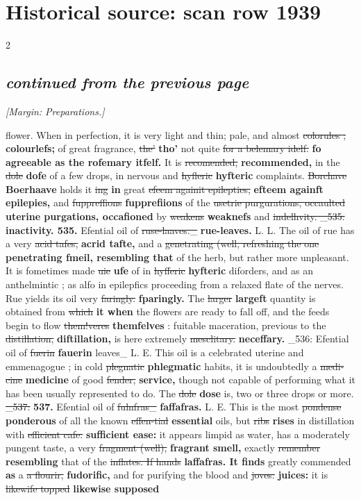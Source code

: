 \documentclass[10pt]{article}
\begin{document}
\section*{Historical source: scan row 1939}
\begin{multicols}{2}
\subsection*{\textit{continued from the previous page}}
{\small\itshape [Margin: Preparations.]}\par
flower. When in perfection, it is very light and thin; pale, and almost \sout{colorules ;} \textbf{colourlefs;} of great fragrance, \sout{the’} \textbf{tho'} not quite \sout{for a belemary idelf.} \textbf{fo agreeable as the rofemary itfelf.} It is \sout{recomended,} \textbf{recommended,} in the \sout{dole} \textbf{dofe} of a few drops, in nervous and \sout{hyfleric} \textbf{hyfteric} complaints. \sout{Borchave} \textbf{Boerhaave} holds it \sout{ing} \textbf{in} great \sout{efeem againit epilepties,} \textbf{efteem againft epilepies,} and \sout{fuppreffions} \textbf{fupprefiions} of the \sout{usetrie purgurations, occaulted} \textbf{uterine purgations, occafioned} by \sout{weakens} \textbf{weaknefs} and \sout{indelhvity. \_535:} \textbf{inactivity. 535.} Efential oil of \sout{ruse-laaves.\_} \textbf{rue-leaves.} L. L. The oil of rue has a very \sout{acid tafes,} \textbf{acrid tafte,} and a \sout{genetrating (well, refreshing the one} \textbf{penetrating fmeil, resembling that} of the herb, but rather more unpleasant. It is fometimes made \sout{uie} \textbf{ufe} of in \sout{hyfferic} \textbf{hyfteric} diforders, and as an anthelmintic ; as alfo in epilepfics proceeding from a relaxed flate of the nerves. Rue yields its oil very \sout{faringly.} \textbf{fparingly.} The \sout{larger} \textbf{largeft} quantity is obtained from \sout{which} \textbf{it when} the flowers are ready to fall off, and the feeds begin to flow \sout{them!veres} \textbf{themfelves} : fuitable maceration, previous to the \sout{distillation,} \textbf{diftillation,} is here extremely \sout{mesclitary.} \textbf{neceffary.} \_536: Efential oil of \sout{fuerin} \textbf{fauerin} leaves\_ L. E. This oil is a celebrated uterine and emmenagogue ; in cold \sout{plegnatic} \textbf{phlegmatic} habits, it is undoubtedly a \sout{medi-cine} \textbf{medicine} of good \sout{fender,} \textbf{service,} though not capable of performing what it has been usually represented to do. The \sout{dole} \textbf{dose} is, two or three drops or more. \sout{\_537:} \textbf{537.} Efential oil of \sout{fulnfras\_} \textbf{faffafras.} L. E. This is the most \sout{pondense} \textbf{ponderous} of all the known \sout{effen-tial} \textbf{essential} oils, but \sout{ribs} \textbf{rises} in distillation with \sout{efficient cafe:} \textbf{sufficient ease:} it appears limpid as water, has a moderately pungent taste, a very \sout{fragment (well),} \textbf{fragrant smell,} exactly \sout{remember} \textbf{resembling} that of the \sout{inflates. If hands} \textbf{laffafras. It finds} greatly commended \textbf{as} a \sout{a flourir,} \textbf{fudorific,} and for purifying the blood and \sout{joves:} \textbf{juices:} it is \sout{likewife topped} \textbf{likewise supposed} 
\end{multicols}
\end{document}
